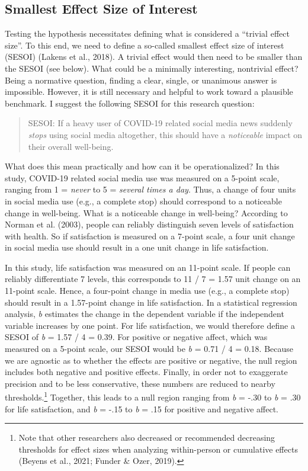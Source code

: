 \documentclass[
  man,mask,floatsintext]{apa7}
\begin{document}
\hypertarget{smallest-effect-size-of-interest}{%
\subsection{Smallest Effect Size of Interest}\label{smallest-effect-size-of-interest}}

Testing the hypothesis necessitates defining what is considered a ``trivial effect size''.
To this end, we need to define a so-called smallest effect size of interest (SESOI) (Lakens et al., 2018).
A trivial effect would then need to be smaller than the SESOI (see below).
What could be a minimally interesting, nontrivial effect?
Being a normative question, finding a clear, single, or unanimous answer is impossible.
However, it is still necessary and helpful to work toward a plausible benchmark.
I suggest the following SESOI for this research question:

\begin{quote}
SESOI: If a heavy user of COVID-19 related social media news suddenly \emph{stops} using social media altogether, this should have a \emph{noticeable} impact on their overall well-being.
\end{quote}

What does this mean practically and how can it be operationalized?
In this study, COVID-19 related social media use was measured on a 5-point scale, ranging from 1 = \emph{never} to 5 = \emph{several times a day}. Thus, a change of four units in social media use (e.g., a complete stop) should correspond to a noticeable change in well-being.
What is a noticeable change in well-being?
According to Norman et al. (2003), people can reliably distinguish seven levels of satisfaction with health.
So if satisfaction is measured on a 7-point scale, a four unit change in social media use should result in a one unit change in life satisfaction.

In this study, life satisfaction was measured on an 11-point scale.
If people can reliably differentiate 7 levels, this corresponds to 11 / 7 = 1.57 unit change on an 11-point scale.
Hence, a four-point change in media use (e.g., a complete stop) should result in a 1.57-point change in life satisfaction.
In a statistical regression analysis, \emph{b} estimates the change in the dependent variable if the independent variable increases by one point.
For life satisfaction, we would therefore define a SESOI of \emph{b} = 1.57 / 4 = 0.39.
For positive or negative affect, which was measured on a 5-point scale, our SESOI would be \emph{b} = 0.71 / 4 = 0.18.
Because we are agnostic as to whether the effects are positive or negative, the null region includes both negative and positive effects.
Finally, in order not to exaggerate precision and to be less conservative, these numbers are reduced to nearby thresholds.\footnote{Note that other researchers also decreased or recommended decreasing thresholds for effect sizes when analyzing within-person or cumulative effects (Beyens et al., 2021; Funder \& Ozer, 2019).}
Together, this leads to a null region ranging from \emph{b} = -.30 to \emph{b} = .30 for life satisfaction, and \emph{b} = -.15 to \emph{b} = .15 for positive and negative affect.
\end{document}
